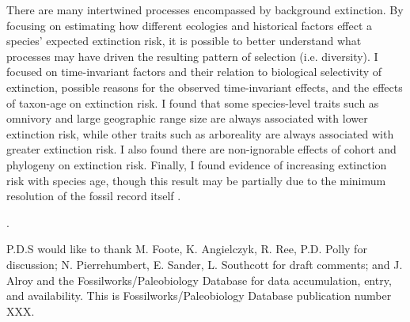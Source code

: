 \documentclass[12pt]{article}
\newcounter{lastnote}
\newenvironment{scilastnote}{%
\setcounter{lastnote}{\value{enumiv}}%
\addtocounter{lastnote}{+1}%
\begin{list}%
{\arabic{lastnote}.}
{\setlength{\leftmargin}{.22in}}
{\setlength{\labelsep}{.5em}}}
{\end{list}}
\begin{document}
There are many intertwined processes encompassed by background extinction. By focusing on estimating how different ecologies and historical factors effect a species' expected extinction risk, it is possible to better understand what processes may have driven the resulting pattern of selection (i.e. diversity). I focused on time-invariant factors and their relation to biological selectivity of extinction, possible reasons for the observed time-invariant effects, and the effects of taxon-age on extinction risk. I found that some species-level traits such as omnivory and large geographic range size are always associated with lower extinction risk, while other traits such as arboreality are always associated with greater extinction risk. I also found there are non-ignorable effects of cohort and phylogeny on extinction risk. Finally, I found evidence of increasing extinction risk with species age, though this result may be partially due to the minimum resolution of the fossil record itself \cite{Sepkoski1975}.





\begin{scilastnote}
\item P.D.S would like to thank M. Foote, K. Angielczyk, R. Ree, P.D. Polly for discussion; N. Pierrehumbert, E. Sander, L. Southcott for draft comments; and J. Alroy and the Fossilworks/Paleobiology Database for data accumulation, entry, and availability. This is Fossilworks/Paleobiology Database publication number XXX.
\end{scilastnote}


\end{document}
